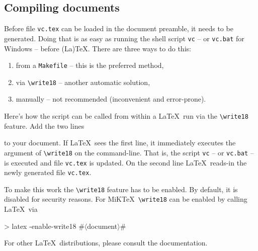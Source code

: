 \documentclass[11pt]{article}
\newlength{\sbslistingwd}
\newcommand*{\descr}[1]{$\langle$#1$\rangle$}
\begin{document}
\subsection{Compiling documents}
\label{sec:compiling}
Before file \texttt{vc.tex} can be loaded in the document preamble, it
needs to be generated.  Doing that is as easy as running the shell
script \texttt{vc} -- or \texttt{vc.bat} for Windows -- before (La)\TeX.
There are three ways to do this:
\begin{enumerate}
\item from a \texttt{Makefile} -- this is the preferred method,
\item via \verb+\write18+ -- another automatic solution,
\item manually -- not recommended (inconvenient and error-prone).
\end{enumerate}

Here's how the script can be called from within a \LaTeX\ run via the
\verb+\write18+ feature.  Add the two lines\newline
\begin{minipage}{\textwidth}
  \begin{minipage}[t]{\sbslistingwd}
    \begin{listing}[style=TeX, title=Unix\strut]
\immediate{}

    \end{listing}
  \end{minipage}\hfill
  \begin{minipage}[t]{\sbslistingwd}
    \begin{listing}[style=TeX, title=Windows\strut]
\immediate{}

    \end{listing}
  \end{minipage}
\end{minipage}
to your document.  If \LaTeX\ sees the first line, it immediately
executes the argument of \verb+\write18+ on the command-line.  That is,
the script \texttt{vc} -- or \texttt{vc.bat} -- is executed and file
\texttt{vc.tex} is updated.  On the second line \LaTeX\ reads-in the
newly generated file \texttt{vc.tex}.

To make this work the \verb+\write18+ feature has to be enabled.  By
default, it is disabled for security reasons.  For MiK\TeX\
\verb+\write18+ can be enabled by calling \LaTeX\ via
\begin{listing}[style=shell, escapechar=\#]
> latex -enable-write18 #\descr{document}#
\end{listing}
For other \LaTeX\ distributions, please consult the documentation.
\end{document}
